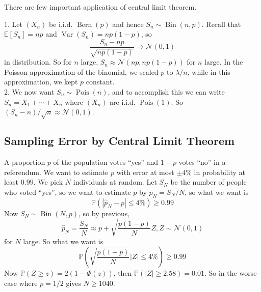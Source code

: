 There are few important application of central limit theorem.
\begin{example}
    1. Let $(X_n)$ be i.i.d. $\operatorname{Bern}(p)$ and hence $S_n\sim\operatorname{Bin}(n,p)$.
    Recall that $\mathbb E[S_n]=np$ and $\operatorname{Var}(S_n)=np(1-p)$, so
    $$\frac{S_n-np}{\sqrt{np(1-p)}}\to\mathcal N(0,1)$$
    in distribution.
    So for $n$ large, $S_n\approx\mathcal N(np,np(1-p))$ for $n$ large.
    In the Poisson approximation of the binomial, we scaled $p$ to $\lambda/n$, while in this approximation, we kept $p$ constant.\\
    2. We now want $S_n\sim\operatorname{Pois}(n)$, and to accomplish this we can write $S_n=X_1+\cdots+X_n$ where $(X_n)$ are i.i.d. $\operatorname{Pois}(1)$.
    So $(S_n-n)/\sqrt{n}\approx \mathcal N(0,1)$.
\end{example}
\subsection{Sampling Error by Central Limit Theorem}
A proportion $p$ of the population votes ``yes'' and $1-p$ votes ``no'' in a referendum.
We want to estimate $p$ with error at most $\pm 4\%$ in probability at least $0.99$.
We pick $N$ individuals at random.
Let $S_N$ be the number of people who voted ``yes'', so we want to estimate $p$ by $\hat{p}_N=S_N/N$, so what we want is
$$\mathbb P(|\hat{p}_N-p|\le 4\%)\ge 0.99$$
Now $S_N\sim\operatorname{Bin}(N,p)$, so by previous,
$$\hat{p}_N=\frac{S_N}{N}\approx p+\sqrt{\frac{p(1-p)}{N}}Z,Z\sim\mathcal N(0,1)$$
for $N$ large.
So what we want is
$$\mathbb P\left( \sqrt{\frac{p(1-p)}{N}}|Z|\le 4\% \right)\ge 0.99$$
Now $\mathbb P(Z\ge z)=2(1-\Phi(z))$, then $\mathbb P(|Z|\ge 2.58)=0.01$.
So in the worse case where $p=1/2$ gives $N\ge 1040$.